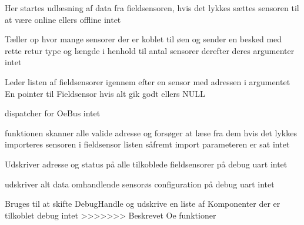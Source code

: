 {Her startes udlæsning af data fra fieldsensoren, hvis det lykkes sættes sensoren til at være online ellers offline}
{intet}
{
}

{Tæller op hvor mange sensorer der er koblet til øen og sender en besked med rette retur type og længde i henhold til antal sensorer derefter deres argumenter}
{intet}
{
}

{Leder listen af fieldsensorer igennem efter en sensor med adressen i argumentet}
{En pointer til Fieldsensor hvis alt gik godt ellers NULL}
{
}

{dispatcher for OeBus}
{intet}
{
}

{funktionen skanner alle valide adresse og forsøger at læse fra dem hvis det lykkes importeres sensoren i fieldsensor listen såfremt import parameteren er sat}
{intet}
{
}

{Udskriver adresse og status på alle tilkoblede fieldsensorer på debug uart}
{intet}
{
}

{udskriver alt data omhandlende sensorøs configuration på debug uart}
{intet}
{
}

{Bruges til at skifte DebugHandle og udskrive en liste af Komponenter der er tilkoblet debug}
{intet}
{
}
>>>>>>> Beskrevet Oe funktioner
